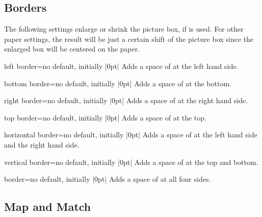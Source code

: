 \documentclass[a4paper,11pt]{ltxdoc}
\begin{document}
\clearpage
\subsection{Borders}

The following settings enlarge or shrink the picture box, if
 is used. For other paper settings, the result
will be just a certain shift of the picture box since the enlarged box
will be centered on the paper.

\begin{docIgrKey}[][doc new=2015-03-12]{left border}{=}{no default, initially |0pt|}
Adds a space of  at the left hand side.
\end{docIgrKey}

\begin{docIgrKey}[][doc new=2015-03-12]{bottom border}{=}{no default, initially |0pt|}
Adds a space of  at the bottom.
\end{docIgrKey}

\begin{docIgrKey}[][doc new=2015-03-12]{right border}{=}{no default, initially |0pt|}
Adds a space of  at the right hand side.
\end{docIgrKey}

\begin{docIgrKey}[][doc new=2015-03-12]{top border}{=}{no default, initially |0pt|}
Adds a space of  at the top.
\end{docIgrKey}

\begin{docIgrKey}[][doc new=2015-03-12]{horizontal border}{=}{no default, initially |0pt|}
Adds a space of  at the left hand side and the right hand side.
\end{docIgrKey}

\begin{docIgrKey}[][doc new=2015-03-12]{vertical border}{=}{no default, initially |0pt|}
Adds a space of  at the top and bottom.
\end{docIgrKey}

\begin{docIgrKey}[][doc new=2015-03-12]{border}{=}{no default, initially |0pt|}
Adds a space of  at all four sides.
\end{docIgrKey}


\clearpage
\subsection{Map and Match}
\end{document}
